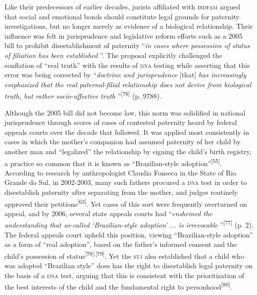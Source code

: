 \documentclass{article}
\begin{document}
Like their predecessors of earlier decades, jurists affiliated with \textsc{ibdfam}
argued that social and emotional bonds should constitute legal grounds for
paternity investigations, but no longer merely as evidence of a biological
relationship. Their influence was felt in jurisprudence and legislative reform
efforts such as a 2005 bill to prohibit disestablishment of paternity
“\textit{in cases where possession of status of filiation has been established}
”. The proposal explicitly challenged the conflation of “real truth” with the
results of \textsc{dna} testing while asserting that this error was being corrected by
“\textit{doctrine and jurisprudence}
[that] \textit{has increasingly emphasized that the real paternal-filial
relationship does not derive from biological truth, but rather socio-affective
truth}
”\textsuperscript{[}\textsuperscript{76}\textsuperscript{]}
(p. 9788).

Although the 2005 bill did not become law, this norm was solidified in national
jurisprudence through scores of cases of contested paternity heard by federal
appeals courts over the decade that followed. It was applied most consistently
in cases in which the mother’s companion had assumed paternity of her child by
another man and “legalized” the relationship by signing the child’s birth
registry, a practice so common that it is known as “Brazilian-style adoption”\textsuperscript{[}\textsuperscript{55}\textsuperscript{]}. According to research by anthropologist Claudia Fonseca in the State of Rio
Grande do Sul, in 2002-2003, many such fathers procured a \textsc{dna} test in order to
disestablish paternity after separating from the mother, and judges routinely
approved their petitions\textsuperscript{[}\textsuperscript{63}\textsuperscript{]}. Yet cases of this sort were frequently overturned on appeal, and by 2006,
several state appeals courts had “\textit{enshrined the understanding that
so-called ‘Brazilian-style adoption’ ... is irrevocable}
”\textsuperscript{[}\textsuperscript{77}\textsuperscript{]}
(p. 2). The federal appeals court upheld this position, viewing “Brazilian-style
adoption” as a form of “real adoption”, based on the father’s informed consent
and the child’s possession of status\textsuperscript{[}\textsuperscript{78}\textsuperscript{]}\textsuperscript{,}\textsuperscript{[}\textsuperscript{79}\textsuperscript{]}. Yet the \textsc{stj} also established that a child who was adopted “Brazilian style”
does has the right to disestablish legal paternity on the basis of a \textsc{dna} test,
arguing that this is consistent with the prioritization of the best interests of
the child and the fundamental right to personhood\textsuperscript{[}\textsuperscript{80}\textsuperscript{]}.
\end{document}
